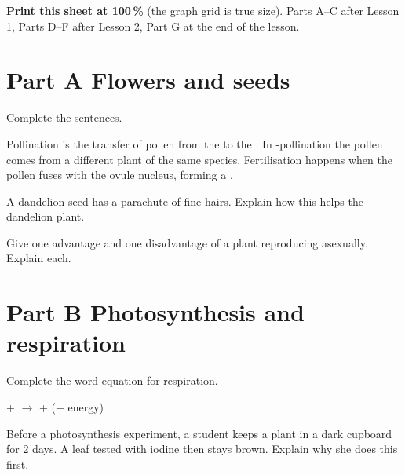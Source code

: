 \documentclass[11pt]{article}
\begin{document}
\textbf{Print this sheet at 100\,\%} (the graph grid is true size). Parts A--C after Lesson 1, Parts D--F after Lesson 2, Part G at the end of the lesson.


\section{Part A \textperiodcentered{} Flowers and seeds}
\Q Complete the sentences.
\par Pollination is the transfer of pollen from the  to the .
In -pollination the pollen comes from a different plant of the same species.
Fertilisation happens when the pollen  fuses with the ovule nucleus, forming a .\par\vspace{2mm}

\Q A dandelion seed has a parachute of fine hairs. Explain how this helps the dandelion plant.

\Q Give one advantage and one disadvantage of a plant reproducing asexually. Explain each.

\section{Part B \textperiodcentered{} Photosynthesis and respiration}
\Q Complete the word equation for respiration.
\par {} +  $\longrightarrow$  +  (+ energy)\par\vspace{2mm}

\Q Before a photosynthesis experiment, a student keeps a plant in a dark cupboard for 2 days. A leaf tested with iodine then stays brown. Explain why she does this first.
\end{document}

